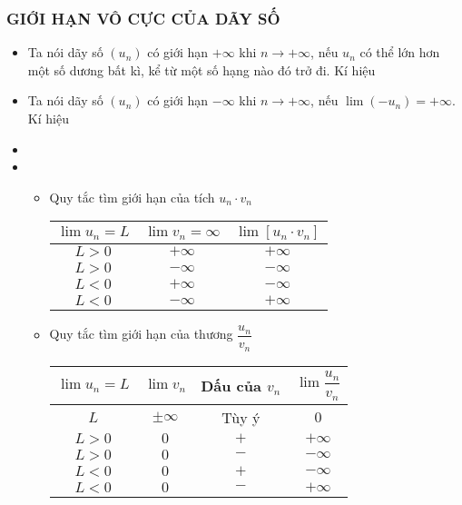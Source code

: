 \subsubsection{GIỚI HẠN VÔ CỰC CỦA DÃY SỐ}
\begin{itemize}
	\item [\iconMT]  Ta nói dãy số $(u_n)$ có giới hạn $+\infty$ khi $n\to +\infty$, nếu $u_n$ có thể lớn hơn một số dương bất kì, kể từ một số hạng nào đó trở đi.	Kí hiệu
	\item [\iconMT]  Ta nói dãy số $(u_n)$ có giới hạn $-\infty$ khi $n\to +\infty$, nếu $\lim (-u_n)=+\infty$. Kí hiệu
	\item [\iconMT] 
	\item [\iconMT] 
	\begin{itemize}
		\item [\ding{172}] Quy tắc tìm giới hạn của tích $u_n\cdot v_n$
		\begin{center}
			\begin{tabular}{|c|c|c|}
				\hline
				$\lim u_n=L$ & $\lim v_n = \infty$   & $\lim \left[{u_n\cdot v_n}\right]$ \\
				\hline
				$L>0$   & $+\infty $   & $+\infty $ \\
				\hline
				$L>0$    & $-\infty $    & $-\infty $ \\
				\hline
				$L<0$   & $+\infty $   & $-\infty $ \\
				\hline
				$L<0$    & $-\infty $    & $+\infty $ \\
				\hline
			\end{tabular}
		\end{center}
		\item [\ding{173}]Quy tắc tìm giới hạn của thương $\dfrac{u_n}{v_n}$
		\begin{center}
			\begin{tabular}{|c|c|c|c|}
				\hline
				$\lim u_n=L$ & $\lim v_n$   & Dấu của $v_n$ & $\lim \dfrac{u_n}{v_n}$\\
				\hline
				$L$   & $\pm \infty $   & Tùy ý & $0$\\
				\hline
				$L>0$   & $0$   & $+$ & $+\infty $\\
				\hline
				$L>0$    & $0$   & $-$ & $-\infty $\\
				\hline
				$L<0$   & $0$   & $+$ & $-\infty $\\
				\hline
				$L<0$    & $0$    & $-$ & $+\infty $\\
				\hline
			\end{tabular}
		\end{center}  
	\end{itemize}
\end{itemize}

